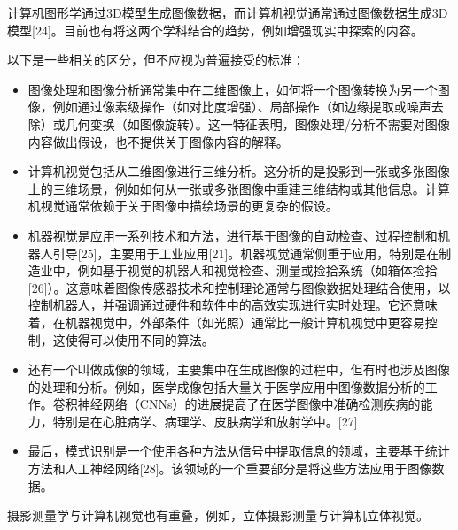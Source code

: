 计算机图形学通过3D模型生成图像数据，而计算机视觉通常通过图像数据生成3D模型[24]。目前也有将这两个学科结合的趋势，例如增强现实中探索的内容。

以下是一些相关的区分，但不应视为普遍接受的标准：
\begin{itemize}
\item 图像处理和图像分析通常集中在二维图像上，如何将一个图像转换为另一个图像，例如通过像素级操作（如对比度增强）、局部操作（如边缘提取或噪声去除）或几何变换（如图像旋转）。这一特征表明，图像处理/分析不需要对图像内容做出假设，也不提供关于图像内容的解释。 
\item 计算机视觉包括从二维图像进行三维分析。这分析的是投影到一张或多张图像上的三维场景，例如如何从一张或多张图像中重建三维结构或其他信息。计算机视觉通常依赖于关于图像中描绘场景的更复杂的假设。
\item 机器视觉是应用一系列技术和方法，进行基于图像的自动检查、过程控制和机器人引导[25]，主要用于工业应用[21]。机器视觉通常侧重于应用，特别是在制造业中，例如基于视觉的机器人和视觉检查、测量或捡拾系统（如箱体捡拾[26]）。这意味着图像传感器技术和控制理论通常与图像数据处理结合使用，以控制机器人，并强调通过硬件和软件中的高效实现进行实时处理。它还意味着，在机器视觉中，外部条件（如光照）通常比一般计算机视觉中更容易控制，这使得可以使用不同的算法。
\item 还有一个叫做成像的领域，主要集中在生成图像的过程中，但有时也涉及图像的处理和分析。例如，医学成像包括大量关于医学应用中图像数据分析的工作。卷积神经网络（CNNs）的进展提高了在医学图像中准确检测疾病的能力，特别是在心脏病学、病理学、皮肤病学和放射学中。[27]
\item 最后，模式识别是一个使用各种方法从信号中提取信息的领域，主要基于统计方法和人工神经网络[28]。该领域的一个重要部分是将这些方法应用于图像数据。
\end{itemize}
摄影测量学与计算机视觉也有重叠，例如，立体摄影测量与计算机立体视觉。
